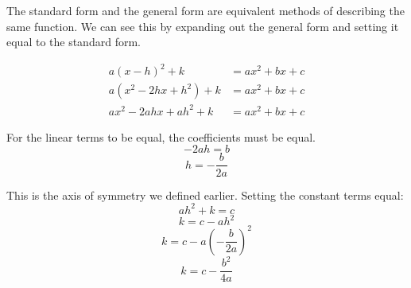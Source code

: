 The standard form and the general form are equivalent methods of describing the same function. We can see this by
expanding out the general form and setting it equal to the standard form.

\begin{align*}
    a(x - h)^2 + k &= ax^2 + bx + c \\
    a(x^2 - 2hx + h^2) + k &= ax^2 + bx + c \\
    ax^2 - 2ahx + ah^2 + k &= ax^2 + bx + c 
\end{align*}

For the linear terms to be equal, the coefficients must be equal.
$$-2ah=b$$ 
$$h=-\frac{b}{2a}$$

This is the axis of symmetry we defined earlier. Setting the constant terms equal:
$$ah^2 + k = c$$
$$k = c - ah^2$$
$$ k = c - a\left(-\frac{b}{2a}\right)^2$$
$$ k = c - \frac{b^2}{4a}$$